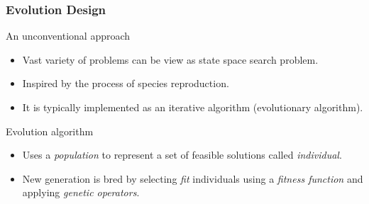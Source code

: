 \documentclass[11pt]{beamer}
\begin{document}
	\begin{frame}
		\frametitle{Evolution Design}
		\begin{block}{An unconventional approach}
			\begin{itemize}[<+->]
				\item Vast variety of problems can be view as state space search problem.
				\item Inspired by the process of species reproduction.
				\item It is typically implemented as an iterative algorithm (evolutionary algorithm).
			\end{itemize}
		\end{block}
		\begin{block}{Evolution algorithm}
			\begin{itemize}[<+->]
				\item Uses a \textit{population} to represent a set of feasible solutions called \textit{individual}.
				\item New generation is bred by selecting \textit{fit} individuals using a \textit{fitness function} 
					and applying \textit{genetic operators}.
			\end{itemize}  
		\end{block}
	\end{frame}
	
\end{document}
